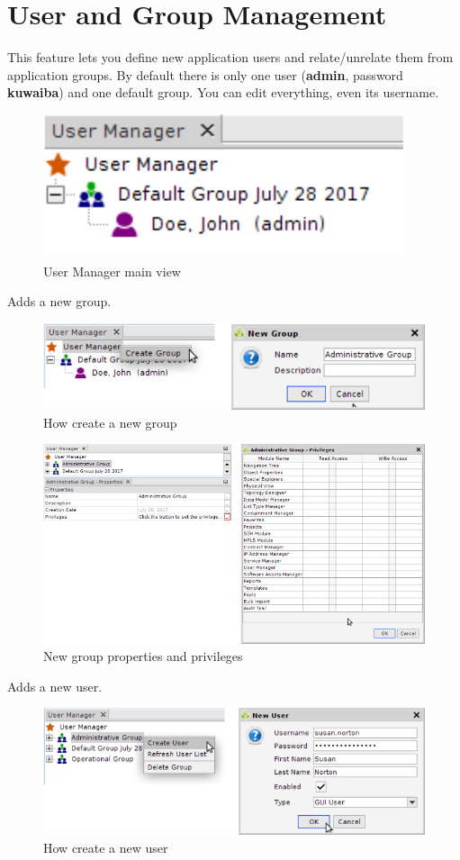 \documentclass[a4paper]{article}
\begin{document}
		\section{User and Group Management} \label{sec:user_and_group_management}
		This feature lets you define new application users and relate/unrelate them from application groups. By default there is only one user (\textbf{admin}, password \textbf{kuwaiba}) and one default group.  You can edit everything, even its username.
		\begin{figure}[h!]
			\centering
			\includegraphics[width=0.3\linewidth]{img/user_manager_first_view.png}
			\caption{User Manager main view}
			\label{fig:user_manager_first_view}
		\end{figure}
		Adds a new group.
		\begin{figure}[h!]
			\centering
			\includegraphics[width=0.5\linewidth]{img/user_manager_new_group.png}
			\caption{How create a new group}
			\label{fig:user_manager_new_group}
		\end{figure}
		\begin{figure}[h!]
			\centering
			\includegraphics[width=0.7\linewidth]{img/user_manager_group_properties_privileges.png}
			\caption{New group properties and privileges}
			\label{fig:user_manager_group_properties_privileges}
		\end{figure}
		Adds a new user.
		\begin{figure}[h!]
			\centering
			\includegraphics[width=0.5\linewidth]{img/user_manager_new_user.png}
			\caption{How create a new user}
			\label{fig:user_manager_new_user}
		\end{figure}
\end{document}
